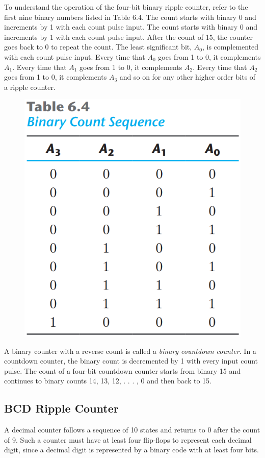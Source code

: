\begin{multicols}{2}
\setlength{\columnsep}{1.5cm}
\setlength{\columnseprule}{0.2pt}

To understand the operation of the four-bit binary ripple counter, refer to the first nine binary numbers listed in Table 6.4. The count starts with binary 0 and increments by 1 with each count pulse input. The count starts with binary 0 and increments by 1 with each count pulse input. After the count of 15, the counter goes back to 0 to repeat the count. The least significant bit, $A_0$, is complemented with each count pulse  input. Every time that $A_0$ goes from 1 to 0, it complements $A_1$. Every time that $A_1$ goes from 1 to 0, it complements $A_2$. Every time that $A_2$ goes from 1 to 0, it complements $A_3$ and so on for any other higher order bits of a ripple counter.

\begin{figure}[H]
  \centering
  \includegraphics[width=.5\linewidth]{img/table-6.4.png}
  \label{table:6.4}
\end{figure}

A binary counter with a reverse count is called a \textit{binary countdown counter}. In a countdown counter, the binary count is decremented by 1 with every input count pulse. The count of a four-bit countdown counter starts from binary 15 and continues to binary counts 14, 13, 12, . . . , 0 and then back to 15.


\subsection{BCD Ripple Counter}
\label{subsec:bcd-ripple-counter}

A decimal counter follows a sequence of 10 states and returns to 0 after the count of 9. Such a counter must have at least four flip-flops to represent each decimal digit, since a decimal digit is represented by a binary code with at least four bits.


\end{multicols}
